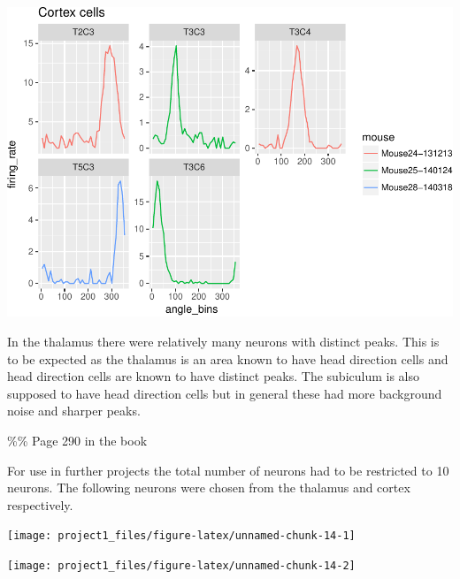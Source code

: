 \documentclass[]{article}
\begin{document}
\begin{center}\includegraphics{project1_files/figure-latex/unnamed-chunk-13-2} \end{center}

In the thalamus there were relatively many neurons with distinct peaks.
This is to be expected as the thalamus is an area known to have head
direction cells and head direction cells are known to have distinct
peaks. The subiculum is also supposed to have head direction cells but
in general these had more background noise and sharper peaks.

\%\% Page 290 in the book

For use in further projects the total number of neurons had to be
restricted to 10 neurons. The following neurons were chosen from the
thalamus and cortex respectively.

\begin{center}\texttt{[image: project1\_files/figure-latex/unnamed-chunk-14-1]} \end{center}

\begin{center}\texttt{[image: project1\_files/figure-latex/unnamed-chunk-14-2]} \end{center}
\end{document}
